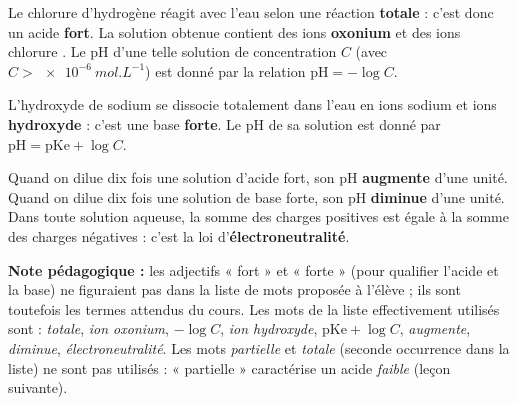 \documentclass[11pt]{article}
\begin{document}
\begin{corrige}
Le chlorure d'hydrogène  réagit avec l'eau selon une réaction \textbf{totale} : c'est donc un acide \textbf{fort}. La solution obtenue contient des ions \textbf{oxonium}  et des ions chlorure . Le pH d'une telle solution de concentration $C$ (avec $C > \SI{e-6}{mol.L^{-1}}$) est donné par la relation $\mathrm{pH} = \textbf{$-\log C$}$.

L'hydroxyde de sodium  se dissocie totalement dans l'eau en ions sodium  et ions \textbf{hydroxyde}  : c'est une base \textbf{forte}. Le pH de sa solution est donné par $\mathrm{pH} = \textbf{$\mathrm{pKe} + \log C$}$.

Quand on dilue dix fois une solution d'acide fort, son pH \textbf{augmente} d'une unité. Quand on dilue dix fois une solution de base forte, son pH \textbf{diminue} d'une unité. Dans toute solution aqueuse, la somme des charges positives est égale à la somme des charges négatives : c'est la loi d'\textbf{électroneutralité}.

\textbf{Note pédagogique :} les adjectifs « fort » et « forte » (pour qualifier l'acide et la base) ne figuraient pas dans la liste de mots proposée à l'élève ; ils sont toutefois les termes attendus du cours. Les mots de la liste effectivement utilisés sont : \emph{totale}, \emph{ion oxonium}, \emph{$-\log C$}, \emph{ion hydroxyde}, \emph{$\mathrm{pKe} + \log C$}, \emph{augmente}, \emph{diminue}, \emph{électroneutralité}. Les mots \emph{partielle} et \emph{totale} (seconde occurrence dans la liste) ne sont pas utilisés : « partielle » caractérise un acide \emph{faible} (leçon suivante).
\end{corrige}
\end{document}
